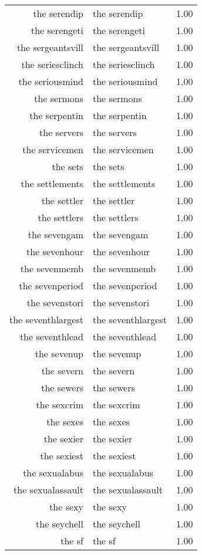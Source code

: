 \begin{table}[ht]
\begin{tabular}{rlr}
  the serendip & the serendip & 1.00 \\ 
  the serengeti & the serengeti & 1.00 \\ 
  the sergeantsvill & the sergeantsvill & 1.00 \\ 
  the seriesclinch & the seriesclinch & 1.00 \\ 
  the seriousmind & the seriousmind & 1.00 \\ 
  the sermons & the sermons & 1.00 \\ 
  the serpentin & the serpentin & 1.00 \\ 
  the servers & the servers & 1.00 \\ 
  the servicemen & the servicemen & 1.00 \\ 
  the sets & the sets & 1.00 \\ 
  the settlements & the settlements & 1.00 \\ 
  the settler & the settler & 1.00 \\ 
  the settlers & the settlers & 1.00 \\ 
  the sevengam & the sevengam & 1.00 \\ 
  the sevenhour & the sevenhour & 1.00 \\ 
  the sevenmemb & the sevenmemb & 1.00 \\ 
  the sevenperiod & the sevenperiod & 1.00 \\ 
  the sevenstori & the sevenstori & 1.00 \\ 
  the seventhlargest & the seventhlargest & 1.00 \\ 
  the seventhlead & the seventhlead & 1.00 \\ 
  the sevenup & the sevenup & 1.00 \\ 
  the severn & the severn & 1.00 \\ 
  the sewers & the sewers & 1.00 \\ 
  the sexcrim & the sexcrim & 1.00 \\ 
  the sexes & the sexes & 1.00 \\ 
  the sexier & the sexier & 1.00 \\ 
  the sexiest & the sexiest & 1.00 \\ 
  the sexualabus & the sexualabus & 1.00 \\ 
  the sexualassault & the sexualassault & 1.00 \\ 
  the sexy & the sexy & 1.00 \\ 
  the seychell & the seychell & 1.00 \\ 
  the sf & the sf & 1.00 \\ 

\end{tabular}
\end{table}
